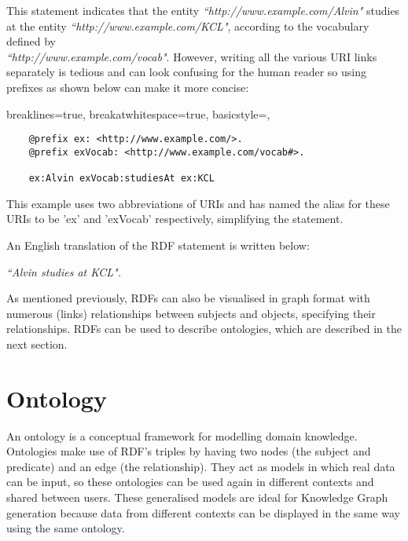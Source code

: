 This statement indicates that the entity \textit{``http://www.example.com/Alvin"} studies at the entity \textit{``http://www.example.com/KCL"}, according to the vocabulary defined by \\\textit{``http://www.example.com/vocab"}. However, writing all the various URI links separately is tedious and can look confusing for the human reader so using prefixes as shown below can make it more concise:

\vspace{-0.2cm}
\lstset
{
    breaklines=true,
    breakatwhitespace=true,
    basicstyle=\linespread{1.5}\ttfamily,
}
\begin{center}
\begin{lstlisting}
    @prefix ex: <http://www.example.com/>. 
    @prefix exVocab: <http://www.example.com/vocab#>. 

    ex:Alvin exVocab:studiesAt ex:KCL
\end{lstlisting}
\end{center} 
\vspace{-0.2cm}

This example uses two abbreviations of URIs and has named the alias for these URIs to be 'ex' and 'exVocab' respectively, simplifying the statement. 

An English translation of the RDF statement is written below: 

\vspace{-0.1cm}
\begin{center}
    \textit{``Alvin studies at KCL".}
\end{center}
\vspace{-0.1cm}

As mentioned previously, RDFs can also be visualised in graph format with numerous (links) relationships between subjects and objects, specifying their relationships. RDFs can be used to describe ontologies, which are described in the next section.

\section{Ontology}
\hspace{0.5cm} An ontology is a conceptual framework for modelling domain knowledge. \cite{ontology} Ontologies make use of RDF's triples by having two nodes (the subject and predicate) and an edge (the relationship). They act as models in which real data can be input, so these ontologies can be used again in different contexts and shared between users. These generalised models are ideal for Knowledge Graph generation because data from different contexts can be displayed in the same way using the same ontology. 

